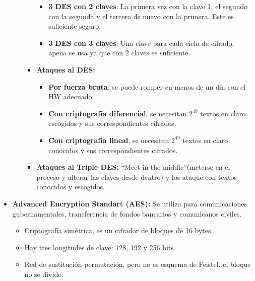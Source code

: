 \documentclass[12pt, twoside, openright]{report} %
\begin{document}
\begin{itemize}
\begin{itemize}
\begin{itemize}
        \begin{itemize}
        \item \textbf{3 DES con 2 claves}: La primera vez con la clave 1, el
          segundo con la segunda y el tercero de nuevo con la primera.
          Este es suficiente seguro.
          
        \item \textbf{3 DES con 3 claves}: Una clave para cada ciclo de
          cifrado, apena se usa ya que con 2 claves es suficiente.
          
        \end{itemize}
      \item \textbf{Ataques al DES:}
        

        \begin{itemize}
        \item \textbf{Por fuerza bruta}: se puede romper en menos de un día
          con el HW adecuado.
          
        \item \textbf{Con criptografía diferencial}, se necesitan $2^{49}$ textos
          en claro escogidos y sus correspondientes cifrados.
          
        \item \textbf{Con criptografía lineal}, se necesitan $2^{49}$ textos en
          claro conocidos y sus correspondientes cifrados.
          
        \end{itemize}
      \item \textbf{Ataques al Triple DES:} ``Meet-in-the-middle''(meterse
        en el proceso y alterar las claves desde dentro) y los ataque
        con textos conocidos y escogidos.
        
      \end{itemize}
    \end{itemize}
  \item \textbf{Advanced Encryption Standart (AES):} Se utiliza para
    comunicaciones gubernamentales, transferencia de fondos bancarios y
    comunícanos civiles.
    

    \begin{itemize}
    \item Criptografía simétrica, es un cifrador de bloques de 16 bytes.
      
    \item Hay tres longitudes de clave: 128, 192 y 256 bits.
      
    \item Red de sustitución-permutación, pero no es esquema de Feistel, el
      bloque no se divide.
      

\end{itemize}
\end{itemize}
\end{document}
